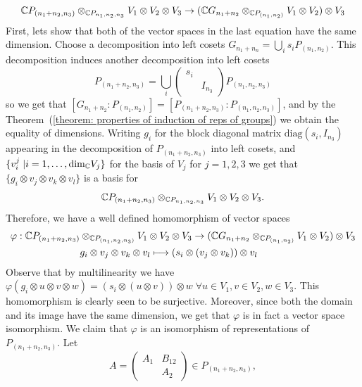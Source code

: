 \begin{equation}
   \mathbb{C}P_{(n_1+n_2,n_3)}\otimes_{\mathbb{C}P_{n_1,n_2,n_3}}V_1\otimes V_2\otimes V_3 \rightarrow (\mathbb{C}G_{n_1+n_2}\otimes_{\mathbb{C}P_{(n_1,n_2)}}V_1\otimes V_2)\otimes V_3
\end{equation}
First, lets show that both of the vector spaces in the last equation have the same dimension. Choose a decomposition into left cosets $G_{n_1+n_n}=\bigcup_{i}s_iP_{(n_1,n_2)}$. This decomposition induces another decomposition into left cosets 
\begin{equation}
    P_{(n_1+n_2,n_3)}=\bigcup_i\begin{pmatrix}s_i&\\&I_{n_3}\end{pmatrix}P_{(n_1,n_2,n_3)}
\end{equation} 
so we get that $[G_{n_1+n_2}:P_{(n_1,n_2)}]=[P_{(n_1+n_2,n_3)}:P_{(n_1,n_2,n_3)}]$, and by the Theorem~(\ref{theorem: properties of induction of reps of groups}) we obtain the equality of dimensions. Writing $g_i$ for the block diagonal matrix $\text{diag}(s_i,I_{n_3})$ appearing in the decomposition of $P_{(n_1+n_2,n_3)}$ into left cosets, and $\{v_i^j\;|i=1,\dots,\text{dim}_{\mathbb{C}}V_j\}$ for the basis of $V_j$ for $j=1,2,3$ we get that $\{g_i\otimes v_j\otimes v_k\otimes v_l\}$ is a basis for
\begin{equation}
   \mathbb{C}P_{(n_1+n_2,n_3)}\otimes_{\mathbb{C}P_{n_1,n_2,n_3}}V_1\otimes V_2\otimes V_3. 
\end{equation}
Therefore, we have a well defined homomorphism of vector spaces
\begin{equation}
    \begin{split}
       \varphi:\mathbb{C}P_{(n_1+n_2,n_3)}&\otimes_{\mathbb{C}P_{(n_1,n_2,n_3)}}V_1\otimes V_2\otimes V_3 \rightarrow (\mathbb{C}G_{n_1+n_2}\otimes_{\mathbb{C}P_{(n_1,n_2)}}V_1\otimes V_2)\otimes V_3 \\
       &g_i\otimes v_j\otimes v_k\otimes v_l\longmapsto (s_i\otimes(v_j\otimes v_k))\otimes v_l
    \end{split}
\end{equation}
Observe that by multilinearity we have $\varphi(g_i\otimes u\otimes v\otimes w) = (s_i\otimes(u\otimes v))\otimes w\;\forall u\in V_1, v\in V_2, w\in V_3$. This homomorphism is clearly seen to be surjective. Moreover, since both the domain and its image have the same dimension, we get that $\varphi$ is in fact a vector space isomorphism. We claim that $\varphi$ is an isomorphism of representations of $P_{(n_1+n_2,n_3)}$. Let 
\begin{equation}
    A=\begin{pmatrix}
        A_1&B_{12}\\
        &A_2
    \end{pmatrix}\in P_{(n_1+n_2,n_3)},
\end{equation}
